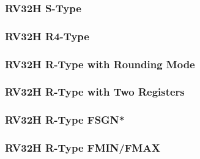 

\subsubsection[{\small RV32H S-Type}]{RV32H S-Type} \label{sec:format-RV32H-SType}



\subsubsection[{\small RV32H R4-Type}]{RV32H R4-Type} \label{sec:format-RV32H-R4TypeRM}



\subsubsection[{\small RV32H R-Type with Rounding Mode}]{RV32H R-Type with Rounding Mode} \label{sec:format-RV32H-R3TypeRM}



\subsubsection[{\small RV32H R-Type with Two Registers}]{RV32H R-Type with Two Registers} \label{sec:format-RV32H-R2TypeRM}



\subsubsection[{\small RV32H R-Type FSGN*}]{RV32H R-Type FSGN*} \label{sec:format-RV32H-RTypeFSGN}



\subsubsection[{\small RV32H R-Type FMIN/FMAX}]{RV32H R-Type FMIN/FMAX} \label{sec:format-RV32H-RTypeFMIN}



